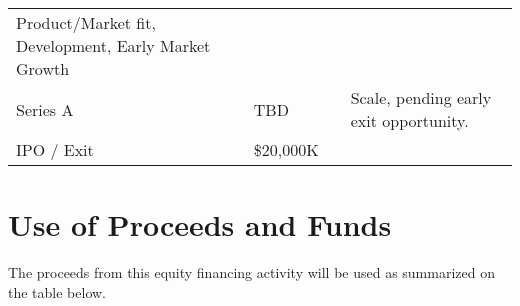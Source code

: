 \documentclass[10pt,openany]{book}
\begin{document}
\begin{longtable}[]{@{}llll@{}}
\begin{minipage}[t]{0.55\columnwidth}
Product/Market fit, Development, Early Market Growth\strut
\end{minipage}\tabularnewline
\begin{minipage}[t]{0.13\columnwidth}\raggedright
Series A\strut
\end{minipage} & \begin{minipage}[t]{0.10\columnwidth}\raggedright
TBD\strut
\end{minipage} & \begin{minipage}[t]{0.10\columnwidth}\raggedright
\strut
\end{minipage} & \begin{minipage}[t]{0.55\columnwidth}\raggedright
Scale, pending early exit opportunity.\strut
\end{minipage}\tabularnewline
\begin{minipage}[t]{0.13\columnwidth}\raggedright
IPO / Exit\strut
\end{minipage} & \begin{minipage}[t]{0.10\columnwidth}\raggedright
\$20,000K\strut
\end{minipage} & \begin{minipage}[t]{0.10\columnwidth}\raggedright
\strut
\end{minipage} & \begin{minipage}[t]{0.55\columnwidth}\raggedright
\strut
\end{minipage}\tabularnewline
\bottomrule
\end{longtable}

\newpage

\hypertarget{use-of-proceeds-and-funds}{%
\section{Use of Proceeds and Funds}\label{use-of-proceeds-and-funds}}

The proceeds from this equity financing activity will be used as
summarized on the table below.
\end{document}
